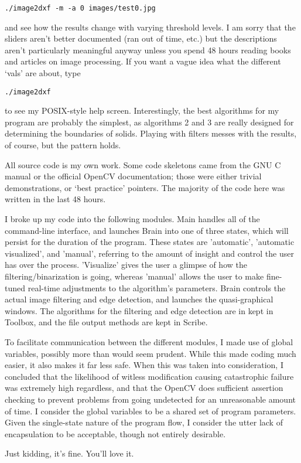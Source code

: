 \documentclass[9pt]{article}
\begin{document}
\begin{verbatim}
./image2dxf -m -a 0 images/test0.jpg
\end{verbatim}

and see how the results change with varying threshold levels. I am sorry that the sliders aren't better documented (ran out of time, etc.) but the descriptions aren't particularly meaningful anyway unless you spend 48 hours reading books and articles on image processing. If you want a vague idea what the different `vals' are about, type 

\begin{verbatim}
./image2dxf
\end{verbatim}

to see my POSIX-style help screen. Interestingly, the best algorithms for my program are probably the simplest, as algorithms 2 and 3 are really designed for determining the boundaries of solids. Playing with filters messes with the results, of course, but the pattern holds. 


All source code is my own work. Some code skeletons came from the GNU C manual or the official OpenCV documentation; those were either trivial demonstrations, or `best practice' pointers. The majority of the code here was written in the last 48 hours.

I broke up my code into the following modules. Main handles all of the command-line interface, and launches Brain into one of three states, which will persist for the duration of the program. These states are 'automatic', 'automatic visualized', and 'manual', referring to the amount of insight and control the user has over the process. 'Visualize' gives the user a glimpse of how the filtering/binarization is going, whereas 'manual' allows the user to make fine-tuned real-time adjustments to the algorithm's parameters. Brain controls the actual image filtering and edge detection, and launches the quasi-graphical windows. The algorithms for the filtering and edge detection are in kept in Toolbox, and the file output methods are kept in Scribe. 


To facilitate communication between the different modules, I made use of global variables, possibly more than would seem prudent. While this made coding much easier, it also makes it far less safe. When this was taken into consideration, I concluded that the likelihood of witless modification causing catastrophic failure was extremely high regardless, and that the OpenCV does sufficient assertion checking to prevent problems from going undetected for an unreasonable amount of time. I consider the global variables to be a shared set of program parameters. Given the single-state nature of the program flow, I consider the utter lack of encapsulation to be acceptable, though not entirely desirable.

Just kidding, it's fine. You'll love it.
\end{document}

